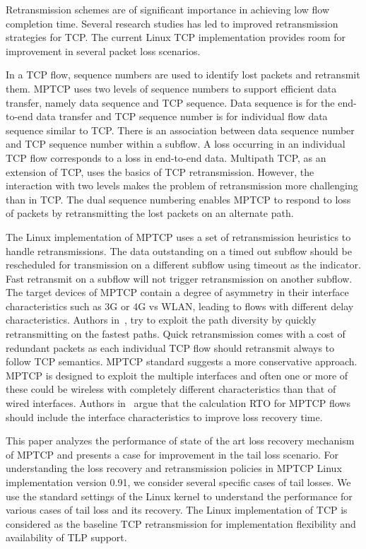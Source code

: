 \documentclass[10pt,conference,compsoc]{IEEEtran}
\begin{document}
Retransmission schemes are of significant importance in achieving low flow completion time. Several research studies has led to improved retransmission strategies for TCP. The current Linux TCP implementation provides room for improvement in several packet loss scenarios. 

In a TCP flow, sequence numbers are used to identify lost packets and retransmit them. MPTCP uses two levels of sequence numbers to support efficient data transfer, namely data sequence and TCP sequence. Data sequence is for the end-to-end data transfer and TCP sequence number is for individual flow data sequence similar to TCP. There is an association between data sequence number and TCP sequence number within a subflow.  A loss occurring in an individual TCP flow corresponds to a loss in end-to-end data. Multipath TCP, as an extension of TCP, uses the basics of TCP retransmission. However, the interaction with two levels makes the problem of retransmission more challenging than in TCP. The dual sequence numbering enables MPTCP to respond to loss of packets by retransmitting the lost packets on an alternate path.  

The Linux implementation of MPTCP uses a set of retransmission heuristics to handle retransmissions. The data outstanding on a timed out subflow should be rescheduled for transmission on a different subflow using timeout as the indicator. Fast retransmit on a subflow will not trigger retransmission on another subflow. The target devices of MPTCP contain a degree of asymmetry in their interface characteristics such as 3G or 4G vs WLAN, leading to flows with different delay characteristics. Authors in~\cite{fuso}, try to exploit the path diversity by quickly retransmitting on the fastest paths. Quick retransmission comes with a cost of redundant packets as each individual TCP flow should retransmit always to follow TCP semantics. MPTCP standard suggests a more conservative approach. MPTCP is designed to exploit the multiple interfaces and often one or more of these could be wireless with completely different characteristics than that of wired interfaces. Authors in~\cite{Shin} argue that the calculation RTO for MPTCP flows should include the interface characteristics to improve loss recovery time. 



This paper analyzes the performance of state of the art loss recovery mechanism of MPTCP and presents a case for improvement in the tail loss scenario. 
For understanding the loss recovery and retransmission policies in MPTCP Linux implementation version 0.91, we consider several specific cases of tail losses.  
We use the standard settings of the Linux kernel to understand the performance for various cases of tail loss and its recovery.
The Linux implementation of TCP is considered as the baseline TCP retransmission for implementation flexibility and availability of TLP support.
\end{document}
